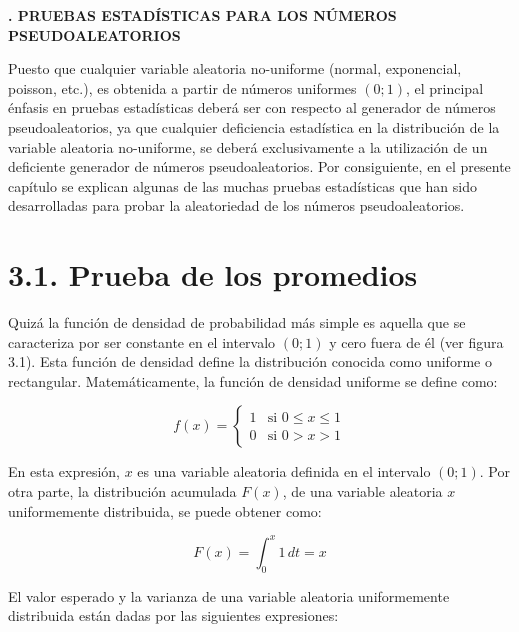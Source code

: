 \documentclass[11pt,letterpaper]{report}
\begin{document}
\begin{center}
{\LARGE\bfseries\linespread{1.3}. PRUEBAS ESTADÍSTICAS PARA LOS NÚMEROS PSEUDOALEATORIOS\par}
\end{center}
\vspace{0.5cm}

\setcounter{chapter}{3}
\setcounter{page}{31}

Puesto que cualquier variable aleatoria no-uniforme (normal, exponencial,
poisson, etc.), es obtenida a partir de números uniformes $(0;1)$, el
principal énfasis en pruebas estadísticas deberá ser con respecto al
generador de números pseudoaleatorios, ya que cualquier deficiencia
estadística en la distribución de la variable aleatoria no-uniforme, se
deberá exclusivamente a la utilización de un deficiente generador de
números pseudoaleatorios. Por consiguiente, en el presente capítulo se
explican algunas de las muchas pruebas estadísticas que han sido
desarrolladas para probar la aleatoriedad de los números pseudoaleatorios.

\section*{3.1. Prueba de los promedios}

Quizá la función de densidad de probabilidad más simple es aquella que
se caracteriza por ser constante en el intervalo $(0;1)$ y cero fuera de
él (ver figura 3.1). Esta función de densidad define la distribución
conocida como uniforme o rectangular. Matemáticamente, la función de
densidad uniforme se define como:

\[
f(x) = \begin{cases} 1 & \text{si } 0 \le x \le 1 \\ 0 & \text{si } 0 > x > 1 \end{cases}
\]

En esta expresión, $x$ es una variable aleatoria definida en el
intervalo $(0;1)$. Por otra parte, la distribución acumulada $F(x)$, de
una variable aleatoria $x$ uniformemente distribuida, se puede obtener
como:

\begin{equation}
F(x) = \int_0^x 1\,dt = x
\end{equation}

El valor esperado y la varianza de una variable aleatoria uniformemente
distribuida están dadas por las siguientes expresiones:
\end{document}
